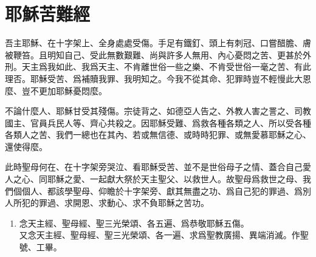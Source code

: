\section*{耶穌苦難經}
吾主耶穌、在十字架上、全身處處受傷。手足有鐵釘、頭上有刺冠、口嘗醋膽、膚被鞭笞。且明知自己、受此無數艱難、尚與許多人無用、內心憂悶之苦、更甚於外刑。天主爲我如此、我爲天主、不肯離世俗一些之樂、不肯受世俗一毫之苦、有此理否。耶穌受苦、爲補贖我罪、我明知之。今我不從其命、犯罪時豈不輕慢此大恩麼、豈不更加耶穌憂悶麼。

不論什麼人、耶穌甘受其殘傷。宗徒背之、如德亞人告之、外教人害之詈之、司教國主、官員兵民人等、齊心共殺之。因耶穌受難、爲救各種各類之人、所以受各種各類人之苦、我們一總也在其內、若或無信德、或時時犯罪、或無愛慕耶穌之心、還使得麼。

此時聖母何在、在十字架旁哭泣、看耶穌受苦、並不是世俗母子之情、蓋合自己愛人之心、同耶穌之愛、一起獻大祭於天主聖父、以救世人。故聖母爲救世之母、我們個個人、都該學聖母、仰瞻於十字架旁、獻其無盡之功、爲自己犯的罪過、爲別人所犯的罪過、求開恩、求動心、求不負耶穌之苦功。

\begin{enumerate}
    \item[]{\small 念天主經、聖母經、聖三光榮頌、各五遍、爲恭敬耶穌五傷。\\
    又念天主經、聖母經、聖三光榮頌、各一遍、求爲聖教廣揚、異端消滅。作聖號、工畢。}
\end{enumerate}